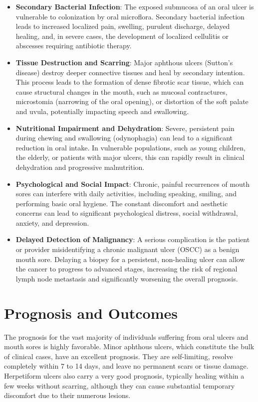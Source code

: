\begin{itemize}
    \item \textbf{Secondary Bacterial Infection}: The exposed submucosa of an oral ulcer is vulnerable to colonization by oral microflora. Secondary bacterial infection leads to increased localized pain, swelling, purulent discharge, delayed healing, and, in severe cases, the development of localized cellulitis or abscesses requiring antibiotic therapy.
    \item \textbf{Tissue Destruction and Scarring}: Major aphthous ulcers (Sutton's disease) destroy deeper connective tissues and heal by secondary intention. This process leads to the formation of dense fibrotic scar tissue, which can cause structural changes in the mouth, such as mucosal contractures, microstomia (narrowing of the oral opening), or distortion of the soft palate and uvula, potentially impacting speech and swallowing.
    \item \textbf{Nutritional Impairment and Dehydration}: Severe, persistent pain during chewing and swallowing (odynophagia) can lead to a significant reduction in oral intake. In vulnerable populations, such as young children, the elderly, or patients with major ulcers, this can rapidly result in clinical dehydration and progressive malnutrition.
    \item \textbf{Psychological and Social Impact}: Chronic, painful recurrences of mouth sores can interfere with daily activities, including speaking, smiling, and performing basic oral hygiene. The constant discomfort and aesthetic concerns can lead to significant psychological distress, social withdrawal, anxiety, and depression.
    \item \textbf{Delayed Detection of Malignancy}: A serious complication is the patient or provider misidentifying a chronic malignant ulcer (OSCC) as a benign mouth sore. Delaying a biopsy for a persistent, non-healing ulcer can allow the cancer to progress to advanced stages, increasing the risk of regional lymph node metastasis and significantly worsening the overall prognosis.
\end{itemize}

\section*{Prognosis and Outcomes}
The prognosis for the vast majority of individuals suffering from oral ulcers and mouth sores is highly favorable. Minor aphthous ulcers, which constitute the bulk of clinical cases, have an excellent prognosis. They are self-limiting, resolve completely within 7 to 14 days, and leave no permanent scars or tissue damage. Herpetiform ulcers also carry a very good prognosis, typically healing within a few weeks without scarring, although they can cause substantial temporary discomfort due to their numerous lesions.

